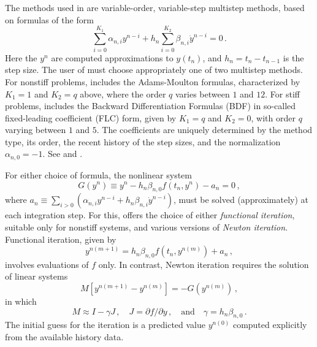 The methods used in {\cvodes} are variable-order, variable-step multistep
methods, based on formulas of the form
\begin{equation}\label{e:lmm}
 \sum_{i = 0}^{K_1} \alpha_{n,i} y^{n-i} + 
     h_n \sum_{i = 0}^{K_2} \beta_{n,i} {\dot{y}}^{n-i} = 0 \, .
\end{equation}
Here the $y^n$ are computed approximations to $y(t_n)$, and
$h_n = t_n - t_{n-1}$ is the step size.  The user of {\cvode} must choose
appropriately one of two multistep methods.  For nonstiff problems,
{\cvode} includes the Adams-Moulton formulas,
characterized by $K_1 = 1$
and $K_2 = q$ above, where the order $q$ varies between $1$ and $12$.
For stiff problems, {\cvodes} includes the Backward Differentiation
Formulas (BDF)   
in so-called fixed-leading coefficient (FLC) form, given by
$K_1 = q$ and $K_2 = 0$, with order $q$ varying between $1$ and $5$.
The coefficients are uniquely determined by the method type, its
order, the recent history of the step sizes, and the normalization
$\alpha_{n,0} = -1$.  See \cite{ByHi:75} and \cite{JaSD:80}.

For either choice of formula, the nonlinear system
\begin{equation}\label{e:nonlinear}
  G(y^n) \equiv y^n - h_n \beta_{n,0} f(t_n,y^n) - a_n = 0 \, ,
\end{equation}
where $a_n\equiv\sum_{i>0}(\alpha_{n,i}y^{n-i}+h_n\beta_{n,i} {\dot{y}}^{n-i})$, 
must be solved (approximately) at each integration step.  For this, {\cvodes}
offers the choice of either {\em functional iteration}, suitable only
for nonstiff systems, and various versions of {\em Newton iteration}.
Functional iteration, given by
\[ y^{n(m+1)} = h_n \beta_{n,0} f(t_n,y^{n(m)}) + a_n \, , \]
involves evaluations of $f$ only.  In contrast, Newton iteration requires
the solution of linear systems
\begin{equation}\label{e:Newton}
  M [y^{n(m+1)} - y^{n(m)}] = -G(y^{n(m)}) \, ,
\end{equation}
in which
\begin{equation}\label{e:Newtonmat} 
  M \approx I - \gamma J \, ,
  \quad J = \partial f / \partial y \, ,
  \quad \mbox{and} \quad
  \gamma = h_n \beta_{n,0} \, . 
\end{equation}
The initial guess for the iteration is a predicted value $y^{n(0)}$
computed explicitly from the available history data.

